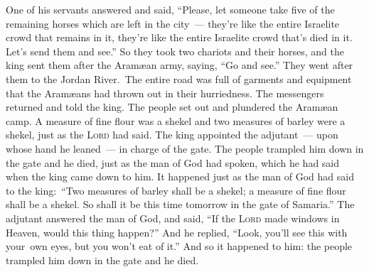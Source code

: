 \begin{inparaenum}
   One of his servants answered and said, ``Please, let someone take five of the remaining horses which are left in the city\understood{}~--- they're like the entire Israelite crowd that remains in it, they're like the entire Israelite crowd that's died in it. Let's send them and see.''%
   So they took two chariots and their horses, and the king sent them after the Aram\ae{}an army, saying, ``Go and see.''%
   They went after them to the Jordan River.\understood\ The entire road was full of garments and equipment that the Aram\ae{}ans had thrown out in their hurriedness. The messengers returned and told the king.%
   The people set out and plundered the Aram\ae{}an camp. A measure of fine flour was a shekel and two measures of barley were a shekel, just as the \textsc{Lord} had said.%
   The king appointed the adjutant~--- upon whose hand he leaned~--- in charge of the gate. The people trampled him down in the gate and he died, just as the man of God had spoken, which he had said when the king came down to him.%
   It happened just as the man of God had said to the king:\, ``Two measures of barley shall be a shekel; a measure of fine flour shall be a shekel. So shall it be this time tomorrow in the gate of Samaria.''%
   The adjutant answered the man of God, and said, ``If the \textsc{Lord} made windows in Heaven, would this thing happen?'' And he replied, ``Look, you'll see this with your\understood\ own eyes, but you won't eat of it.''%
   And so it happened to him: the people trampled him down in the gate and he died.%
\end{inparaenum}
